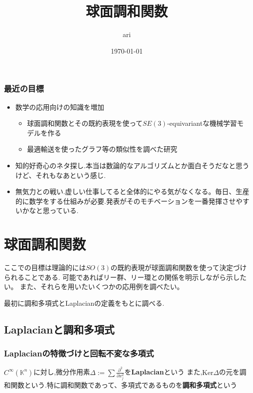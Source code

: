 \documentclass[uplatex]{jsbook}
\title{球面調和関数}
\author{ari}
\date{\today}
\begin{document}
\maketitle
\tableofcontents

\section{最近の目標}
\begin{itemize}
    \item 数学の応用向けの知識を増加
    \begin{itemize}
        \item 球面調和関数とその既約表現を使って$SE(3)$-equivariantな機械学習モデルを作る
        \item 最適輸送を使ったグラフ等の類似性を調べた研究
    \end{itemize}
    \item 知的好奇心のネタ探し.本当は数論的なアルゴリズムとか面白そうだなと思うけど、それもなあという感じ.
    \item 無気力との戦い.虚しい仕事してると全体的にやる気がなくなる。毎日、生産的に数学をする仕組みが必要.発表がそのモチベーションを一番発揮させやすいかなと思っている.
\end{itemize}

\part{球面調和関数}

ここでの目標は理論的には$SO(3)$の既約表現が球面調和関数を使って決定づけられることである.
可能であればリー群、リー環との関係を明示しながら示したい。
また、それらを用いたいくつかの応用例を調べたい。

最初に調和多項式とLaplacianの定義をもとに調べる.


\chapter{Laplacianと調和多項式}
\section{Laplacianの特徴づけと回転不変な多項式}

\begin{dfn}
$C^{\infty}(\mathbb{K}^n)$に対し,微分作用素$\Delta:= \sum \frac{\partial^2}{\partial x_j^2}$を\textbf{Laplacian}という
また,$\mathrm{Ker} \Delta$の元を調和関数という.特に調和関数であって、多項式であるものを\textbf{調和多項式}という
\end{dfn}
\end{document}
